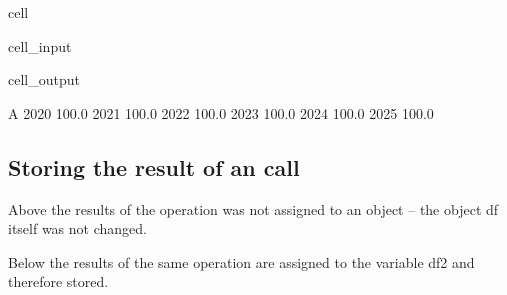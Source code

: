 \documentclass[letterpaper,10pt,english]{jupyterBook}
\begin{document}
\begin{sphinxuseclass}{cell}\begin{sphinxVerbatimInput}

\begin{sphinxuseclass}{cell_input}
\begin{sphinxVerbatim}[commandchars=\\\{\}]
\end{sphinxVerbatim}

\end{sphinxuseclass}\end{sphinxVerbatimInput}
\begin{sphinxVerbatimOutput}

\begin{sphinxuseclass}{cell_output}
\begin{sphinxVerbatim}[commandchars=\\\{\}]
          A
2020  100.0
2021  100.0
2022  100.0
2023  100.0
2024  100.0
2025  100.0
\end{sphinxVerbatim}

\end{sphinxuseclass}\end{sphinxVerbatimOutput}

\end{sphinxuseclass}

\subsection{Storing the result of an  call}
\label{\detokenize{content/04_PythonEssentials/mfcalc:storing-the-result-of-an-mfcalc-call}}
\sphinxAtStartPar
Above the results of the  operation was not assigned to an object – the  object df itself was not changed.

\sphinxAtStartPar
Below the results of the same operation are assigned to the variable df2 and therefore stored.
\end{document}
